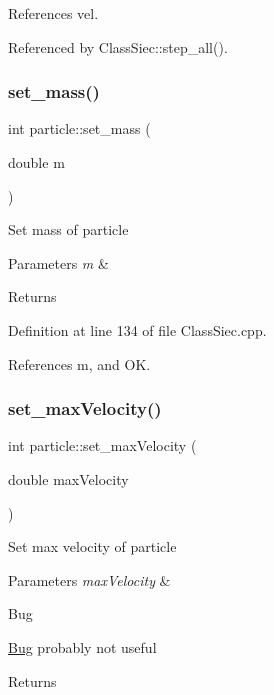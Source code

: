 References vel.



Referenced by Class\+Siec\+::step\+\_\+all().

\mbox{\label{structparticle_af0c523c22c7b51a1a932f5f3f30b24a3}} 
\subsubsection{\texorpdfstring{set\+\_\+mass()}{set\_mass()}}
{\footnotesize\ttfamily int particle\+::set\+\_\+mass (\begin{DoxyParamCaption}\item[{double}]{m }\end{DoxyParamCaption})}

Set mass of particle 
\begin{DoxyParams}{Parameters}
{\em m} & \\
\hline
\end{DoxyParams}
\begin{DoxyReturn}{Returns}

\end{DoxyReturn}


Definition at line 134 of file Class\+Siec.\+cpp.



References m, and OK.

\mbox{\label{structparticle_a842a75343ebbcdcaf53e95f0f1286d9a}} 
\subsubsection{\texorpdfstring{set\+\_\+max\+Velocity()}{set\_maxVelocity()}}
{\footnotesize\ttfamily int particle\+::set\+\_\+max\+Velocity (\begin{DoxyParamCaption}\item[{double}]{max\+Velocity }\end{DoxyParamCaption})}

Set max velocity of particle 
\begin{DoxyParams}{Parameters}
{\em max\+Velocity} & \\
\hline
\end{DoxyParams}
\begin{DoxyRefDesc}{Bug}
\item[\mbox{\hyperlink{bug__bug000001}{Bug}}]probably not useful \end{DoxyRefDesc}
\begin{DoxyReturn}{Returns}

\end{DoxyReturn}


